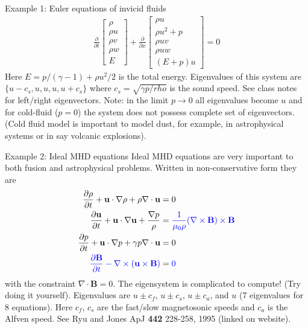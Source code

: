 \documentclass[aspectratio=169]{beamer}
\newcommand{\mvec}[1]{\mathbf{#1}}
\begin{document}
\begin{frame}{Example 1: Euler equations of invicid fluids}
  \begin{align*}
    \frac{\partial}{\partial{t}}    
    \left[
    \begin{matrix}
      \rho \\
      \rho u \\
      \rho v \\
      \rho w \\
      E
    \end{matrix}
    \right]
    +
    \frac{\partial}{\partial{x}}
    \left[
    \begin{matrix}
      \rho u \\
      \rho u^2 + p \\
      \rho uv \\
      \rho uw \\
      (E+p)u
    \end{matrix}
    \right]
    =
    0    
  \end{align*}
  Here $E = p/(\gamma-1) + \rho u^2/2$ is the total
  energy. Eigenvalues of this system are $\{u-c_s,u,u,u,u+c_s \}$
  where $c_s = \sqrt{\gamma p/rho}$ is the sound speed. See class
  notes for left/right eigenvectors.%
  \vskip0.1in%
  Note: in the limit $p\rightarrow 0$ all eigenvalues become $u$ and
  for cold-fluid ($p=0$) the system does not possess complete set of
  eigenvectors. (Cold fluid model is important to model dust, for
  example, in astrophysical systems or in say volcanic explosions).
\end{frame}

\begin{frame}{Example 2: Ideal MHD equations}
  \footnotesize%
  Ideal MHD equations are very important to both fusion and
  astrophysical problems. Written in non-conservative form they are
  \begin{align*}
    \frac{\partial \rho}{\partial t}+ \mvec{u}\cdot\nabla\rho + \rho\nabla\cdot\mathbf{u}&=0 \\
    \frac{\partial \mathbf{u}}{\partial t}+\mathbf{u} \cdot \nabla
    \mathbf{u}
    +\frac{\nabla p}{\rho} &=
                             \color{blue}{\frac{1}{\mu_{0}\rho}(\nabla \times \mathbf{B}) \times \mathbf{B}} \\
    \frac{\partial p}{\partial t}+\mathbf{u} \cdot \nabla p+\gamma p
    \nabla \cdot \mathbf{u} &= 0 \\
    \color{blue}{\frac{\partial \mathbf{B}}{\partial t}-\nabla \times(\mathbf{u} \times \mathbf{B})} &= \color{blue}{0}
  \end{align*}
  with the constraint $\nabla\cdot\mvec{B} = 0$. The eigensystem is
  complicated to compute! (Try doing it yourself). Eigenvalues are
  $u\pm c_f$, $u\pm c_s$, $u\pm c_a$, and $u$ (7 eigenvalues for 8
  equations). Here $c_f$, $c_s$ are the fast/slow magnetosonic speeds
  and $c_a$ is the Alfven speed. See Ryu and Jones ApJ {\bf 442}
  228-258, 1995 (linked on website).
\end{frame}
\end{document}
